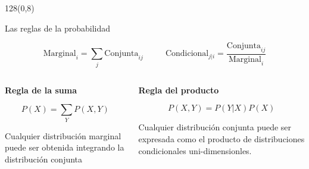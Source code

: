 \documentclass[shownotes]{beamer}
\begin{document}
\begin{frame}
\begin{textblock}{128}(0,8)
\begin{center}
 \large Las reglas de la probabilidad
\end{center}
\end{textblock}


\vspace{0.75cm}



\begin{equation*}
  \text{Marginal}_{i} = \sum_j \text{Conjunta}_{ij}  \ \ \ \ \ \ \ \ \ \ \ \  \text{Condicional}_{j|i} = \frac{\text{Conjunta}_{ij}}{\text{Marginal}_{i}}
\end{equation*}

\pause
\vspace{0.75cm}


\begin{columns}[t]
\begin{column}{0.5\textwidth}
 \centering \textbf{Regla de la suma}
 
 
\begin{equation*}
 P(X) = \sum_Y P(X,Y)
\end{equation*}
 
 \justifying \footnotesize
  Cualquier distribución marginal puede ser obtenida integrando la distribución conjunta

 \end{column}
 \begin{column}{0.5\textwidth}
\centering  \textbf{Regla del producto}

\begin{equation*}
 P(X,Y) = P(Y|X) P(X)
\end{equation*}

 \justifying \footnotesize
Cualquier distribución conjunta puede ser expresada como el producto de distribuciones condicionales uni-dimensionles.

\end{column}
\end{columns}

\end{frame}
\end{document}
